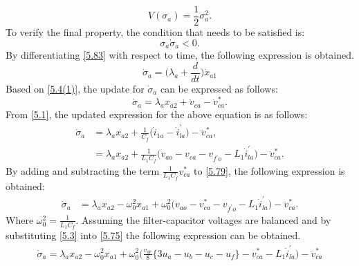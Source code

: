 \begin{equation} \label{5.6(1)} %
V(\sigma_{a}) = \frac{1}{2} \sigma_{a}^{2}.
\end{equation}
To verify the final property, the condition that needs to be satisfied is:
\begin{equation} \label{5.7(1)} %
\sigma_{a} \dot{\sigma}_{a} < 0.
\end{equation}
By differentiating \eqref{5.83} with respect to time, the following expression is obtained.
\begin{equation} \label{5.77} %
\dot{\sigma}_a = \Big(\lambda_a + \frac{d}{dt}\Big) \dot{x}_{a1}
\end{equation}
Based on \eqref{5.4(1)}, the update for $\dot{\sigma}_a$ can be expressed as follows:
\begin{equation} \label{5.78} %
\dot{\sigma}_a = \lambda_a x_{a2} + \ddot{v}_{ca} - \ddot{v}^{*}_{ca}.
\end{equation}
From \eqref{5.1}, the updated expression for the above equation is as follows: 
\begin{equation} \label{5.79} %
\begin{aligned}
\dot{\sigma}_a &= \lambda_a x_{a2} + \frac{1}{C_f} \Big(\dot{i}_{1a} - \dot{i}^{\prime}_{la} \Big) - \ddot{v}^{*}_{ca}, \\
&= \lambda_a x_{a2} + \frac{1}{L_{1}C_f} \Big(v_{ao} - v_{ca} - v_{f^{\prime}o} - L_1\dot{i}^{\prime}_{la} \Big) - \ddot{v}^{*}_{ca}.
\end{aligned}
\end{equation}
By adding and subtracting the term $\frac{1}{L_{1}C_f} v^{*}_{ca} $ to \eqref{5.79}, the following expression is obtained: 
\begin{equation} \label{5.75} %
\begin{aligned}
\dot{\sigma}_a &= \lambda_a x_{a2} - \omega^{2}_{0} x_{a1} + \omega^{2}_{0} \Big(v_{ao} - v^{*}_{ca} - v_{f^{\prime}o} - L_1\dot{i}^{\prime}_{la} \Big) - \ddot{v}^{*}_{ca}.
\end{aligned}
\end{equation}
Where $\omega^{2}_{0} = \frac{1}{L_{1}C_f}$. Assuming the filter-capacitor voltages are balanced and by substituting \eqref{5.3} into \eqref{5.75} the following expression can be obtained.
\begin{equation} \label{5.76} %
\begin{aligned}
\dot{\sigma}_a = \lambda_a x_{a2} - \omega^{2}_{0} x_{a1} + \omega^{2}_{0}  \Big(\frac{v_{dc}}{8} \big\{3u_{a} - u_{b} - u_{c} - u_{f} \big\}
- v^{*}_{ca} - L_1\dot{i}^{\prime}_{la} \Big) - \ddot{v}^{*}_{ca} 
\end{aligned}
\end{equation}
